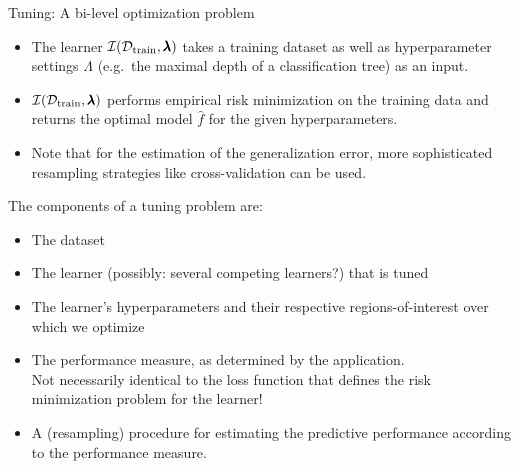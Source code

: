 \begin{frame}{Tuning: A bi-level optimization problem}
\begin{itemize}
\item The learner $\mathcal{I}(\mathcal{D}_{\text{train}}, \pmb{\lambda})$ takes a training dataset as well as hyperparameter settings $\Lambda$ (e.g.\ the maximal depth of a classification tree) as an input.
\item $\mathcal{I}(\mathcal{D}_{\text{train}}, \pmb{\lambda})$ performs empirical risk minimization on the training data and returns the optimal model $\hat f$ for the given hyperparameters.
\item Note that for the estimation of the generalization error, more sophisticated resampling strategies like cross-validation can be used.
\end{itemize}

\framebreak

The components of a tuning problem are:

\begin{itemize}
\item The dataset
\item The learner (possibly: several competing learners?) that is tuned %
\item The learner's hyperparameters and their respective regions-of-interest over which we optimize %
\item The performance measure, as determined by the application.\\ Not necessarily identical to the loss function that defines the risk minimization problem for the learner!\\
\item A (resampling) procedure for estimating the predictive performance according to the performance measure.
\end{itemize}



\end{frame}




